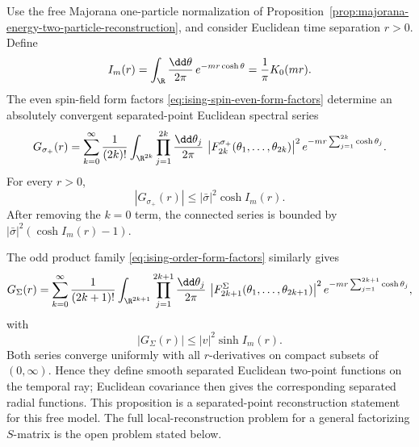 \begin{proposition}
\label{prop:ising-spin-separated-euclidean-series}
Use the free Majorana one-particle normalization of
Proposition~\ref{prop:majorana-energy-two-particle-reconstruction}, and
consider Euclidean time separation \(r>0\).  Define
\begin{equation}
  I_m(r)
  =
  \int_{\R}\frac{\dd\theta}{2\pi}\,e^{-mr\cosh\theta}
  =
  \frac{1}{\pi}K_0(mr).
  \label{eq:ising-one-particle-euclidean-majorant}
\end{equation}
The even spin-field form factors
\eqref{eq:ising-spin-even-form-factors} determine an absolutely convergent
separated-point Euclidean spectral series
\begin{equation}
  G_{\sigma_+}(r)
  =
  \sum_{k=0}^{\infty}\frac{1}{(2k)!}
  \int_{\R^{2k}}\prod_{j=1}^{2k}\frac{\dd\theta_j}{2\pi}\,
  \left|F_{2k}^{\sigma_+}(\theta_1,\ldots,\theta_{2k})\right|^2
  e^{-mr\sum_{j=1}^{2k}\cosh\theta_j}.
  \label{eq:ising-spin-even-spectral-series}
\end{equation}
For every \(r>0\),
\begin{equation}
  |G_{\sigma_+}(r)|
  \le
  |\bar\sigma|^2\cosh I_m(r).
  \label{eq:ising-spin-even-majorant}
\end{equation}
After removing the \(k=0\) term, the connected series is bounded by
\(|\bar\sigma|^2(\cosh I_m(r)-1)\).

The odd product family \eqref{eq:ising-order-form-factors} similarly gives
\begin{equation}
  G_{\Sigma}(r)
  =
  \sum_{k=0}^{\infty}\frac{1}{(2k+1)!}
  \int_{\R^{2k+1}}\prod_{j=1}^{2k+1}\frac{\dd\theta_j}{2\pi}\,
  \left|F_{2k+1}^{\Sigma}(\theta_1,\ldots,\theta_{2k+1})\right|^2
  e^{-mr\sum_{j=1}^{2k+1}\cosh\theta_j},
  \label{eq:ising-spin-odd-spectral-series}
\end{equation}
with
\begin{equation}
  |G_{\Sigma}(r)|
  \le
  |v|^2\sinh I_m(r).
  \label{eq:ising-spin-odd-majorant}
\end{equation}
Both series converge uniformly with all \(r\)-derivatives on compact subsets
of \((0,\infty)\).  Hence they define smooth separated Euclidean two-point
functions on the temporal ray; Euclidean covariance then gives the
corresponding separated radial functions.  This proposition is a
separated-point reconstruction statement for this free model.  The full
local-reconstruction problem for a general factorizing \(S\)-matrix is the
open problem stated below.
\end{proposition}

